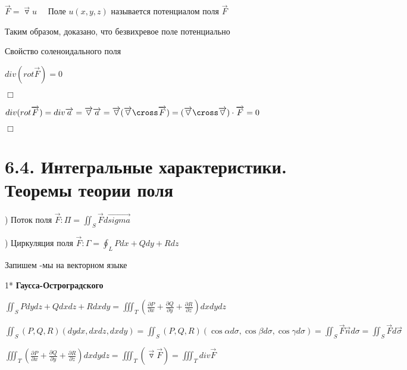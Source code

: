 \documentclass[12pt]{article}
\begin{document}
    \Def $\overrightarrow{F} = \overrightarrow{\triangledown} u \quad$ Поле $u(x, y, z)$ называется потенциалом поля $\overrightarrow{F}$

    Таким образом, доказано, что безвихревое поле потенциально

     Свойство соленоидального поля

    $div (rot \overrightarrow{F}) = 0$

    $\Box$

    $div (rot \overrightarrow{F}) = div \overrightarrow{a} = \overrightarrow{\triangledown} \overrightarrow{a} = \overrightarrow{\triangledown} (\overrightarrow{\triangledown} \cross \overrightarrow{F}) = (\overrightarrow{\triangledown} \cross \overrightarrow{\triangledown}) \cdot \overrightarrow{F} = 0$

    $\Box$

    \section{6.4. Интегральные характеристики. Теоремы теории поля}

    ) Поток поля $\displaystyle \overrightarrow{F}: \Pi = \iint_S \overrightarrow{F}d\overrightarrow{sigma}$

    ) Циркуляция поля $\displaystyle \overrightarrow{F}: \Gamma = \oint_L Pdx + Qdy + Rdz$

    \Nota Запишем \Ths-мы на векторном языке

    1* \textbf{Гаусса-Остроградского}

    $\displaystyle \iint_S Pdydz + Qdxdz + Rdxdy = \iiint_T (\frac{\partial P}{\partial x} + \frac{\partial Q}{\partial y} + \frac{\partial R}{\partial z}) dxdydz$

    $\displaystyle \iint_S (P, Q, R) (dydx, dxdz, dxdy) = \iint_S (P, Q, R) (\cos\alpha d\sigma, \cos\beta d\sigma, \cos\gamma d\sigma) =
    \iint_S \overrightarrow{F} \overrightarrow{n} d\sigma = \iint_S \overrightarrow{F} d\overrightarrow{\sigma}$

    $\displaystyle \iiint_T (\frac{\partial P}{\partial x} + \frac{\partial Q}{\partial y} + \frac{\partial R}{\partial z}) dxdydz = \iiint_T (\overrightarrow{\triangledown} \overrightarrow{F}) = \iiint_T div \overrightarrow{F}$


    \vspace{5mm}
\end{document}
